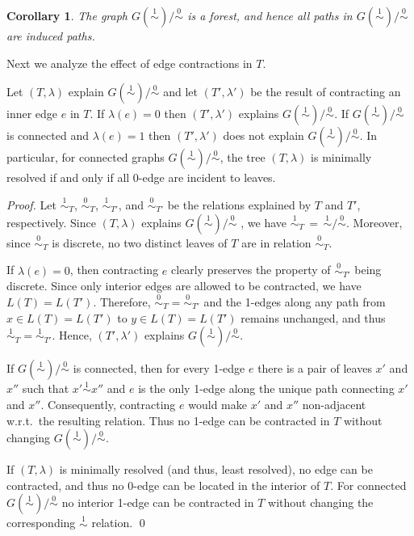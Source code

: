 \documentclass[smallextended]{svjour3}
\newcommand{\rev}[1]{\begingroup\color{blue}#1\endgroup}
\newcommand{\Ro}{\mathrel{\overset{0}{\sim}}}
\newcommand{\Rl}{\mathrel{\overset{1}{\sim}}}
\newtheorem{cor}[thm]{Corollary}
\begin{document}
\begin{cor}
  The graph $G(\Rl)/\Ro$ is a forest, and hence all paths in $G(\Rl)/\Ro$
  are induced paths.
  \label{cor:cycle-free}
\end{cor}

Next we analyze the effect of edge contractions in $T$.

\begin{lemma}
  Let $(T,\lambda)$ explain $G(\Rl)/\Ro$ and let $(T',\lambda')$ be the
  result of contracting an \rev{inner} edge  $e$ in $T$. If $\lambda(e)=0$
  then $(T',\lambda')$ explains $G(\Rl)/\Ro$. If $G(\Rl)/\Ro$ is connected
  and $\lambda(e)=1$ then $(T',\lambda')$ does not explain $G(\Rl)/\Ro$.
  In particular, for connected graphs $G(\Rl)/\Ro$, the tree $(T,\lambda)$
  is \rev{minimally resolved} 	%
	if and only if all 0-edge are incident to leaves.
\end{lemma}
\begin{proof}
  Let $\Rl_T$, $\Ro_T$, $\Rl_{T'}$, and $\Ro_{T'}$ be the relations
  explained by $T$ and $T'$, respectively.  Since $(T,\lambda)$ explains
  $G(\Rl)/\Ro$ , we have $\Rl_T\,=\,\Rl/\Ro$. Moreover, since $\Ro_T$ is
  discrete, no two distinct leaves of $T$ are in relation $\Ro_T$.

  If $\lambda(e)=0$, then contracting $e$ clearly preserves the property of
  $\Ro_{T'}$ being discrete.  Since only interior edges are allowed to be
  contracted, we have $L(T)=L(T')$. Therefore, $\Ro_T =\Ro_{T'}$ and the
  1-edges along any path from $x\in L(T)=L(T')$ to $y\in L(T)=L(T')$
  remains unchanged, and thus $\Rl_T=\Rl_{T'}$.  Hence, $(T',\lambda')$
  explains $G(\Rl)/\Ro$.

  If $G(\Rl)/\Ro$ is connected, then for every 1-edge $e$ there is a pair
  of leaves $x'$ and $x''$ such that $x'\Rl x''$ and $e$ is the only 1-edge
  along the unique path connecting $x'$ and $x''$. Consequently,
  contracting $e$ would make $x'$ and $x''$ non-adjacent w.r.t.\ the
  resulting relation.  Thus no 1-edge can be contracted in $T$ without
  changing $G(\Rl)/\Ro$.

  If $(T,\lambda)$ is \rev{minimally resolved (and thus, least resolved)}, no edge can be contracted, and thus
  no 0-edge can be located in the interior of $T$. For connected
  $G(\Rl)/\Ro$ no interior 1-edge can be contracted in $T$ without changing
  the corresponding $\Rl$ relation. \qed
\end{proof}
\end{document}
